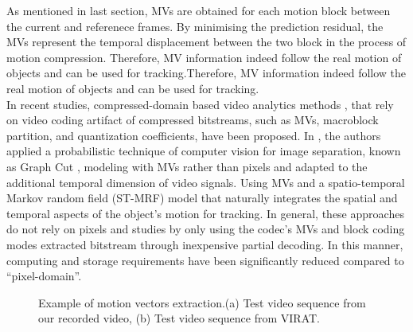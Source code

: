  As mentioned in last section, MVs are obtained for each motion block between the current and referenece frames. By minimising the prediction residual, the MVs represent the temporal displacement between the two block in the process of motion compression. Therefore, MV information indeed follow the real motion of objects and can be used for tracking.Therefore, MV information indeed follow the real motion of objects and can be used for tracking.\\
In recent studies, compressed-domain based video analytics methods  \cite{bombardelli2018efficient},\cite{khatoonabadi2012video} that rely on video coding artifact of compressed bitstreams, such as MVs, macroblock partition, and quantization coefficients, have been proposed. In \cite{bombardelli2018efficient}, the authors applied a probabilistic technique of computer vision for image separation, known as Graph Cut \cite{boykov2001fast}, modeling with MVs rather than pixels and adapted to the additional temporal dimension of video signals. Using MVs and a spatio-temporal Markov random field (ST-MRF) model that naturally integrates the spatial and temporal aspects of the object’s motion for tracking. In general, these approaches do not rely on pixels and studies by only using the codec’s MVs and block coding modes extracted bitstream through inexpensive partial decoding. In this manner, computing and storage requirements have been significantly reduced compared to “pixel-domain”.\\

\begin{figure}
\centering
{}
 \caption{ Example of motion vectors extraction.(a) Test video sequence from our recorded video, (b) Test video sequence from VIRAT.}
 \label{fig:noise}
\end{figure}

